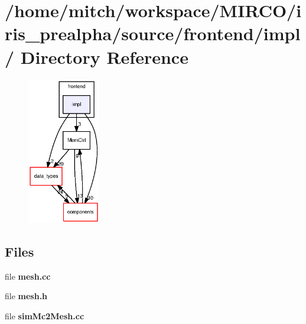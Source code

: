 \section{/home/mitch/workspace/MIRCO/iris\_\-prealpha/source/frontend/impl/ Directory Reference}
\label{dir_d4e7b0aae203bd42c2cb03b55f731c8d}


\nopagebreak
\begin{figure}[H]
\begin{center}
\leavevmode
\includegraphics[width=90pt]{dir_d4e7b0aae203bd42c2cb03b55f731c8d_dep}
\end{center}
\end{figure}
\subsection*{Files}
\begin{CompactItemize}
\item 
file {\bf mesh.cc}
\item 
file {\bf mesh.h}
\item 
file {\bf simMc2Mesh.cc}
\end{CompactItemize}
